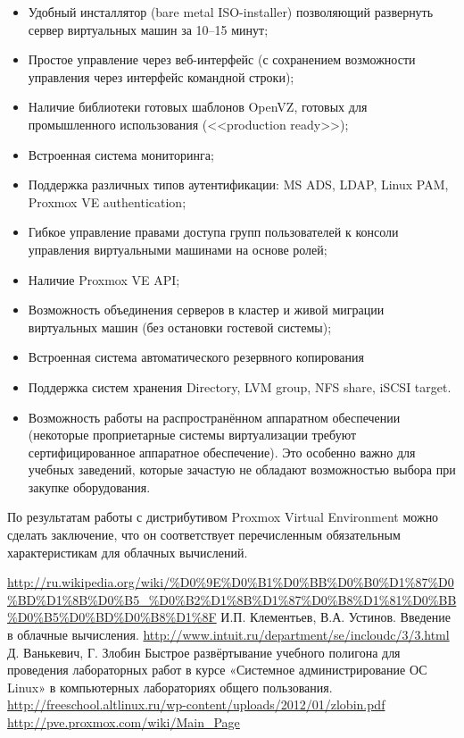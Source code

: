 \documentclass[10pt, a5paper]{article}
\begin{document}
\begin{itemize}
  \item Удобный инсталлятор (bare metal ISO-installer) позволяющий развернуть сервер виртуальных машин за 10--15 минут;
  \item Простое управление через веб-интерфейс (с сохранением возможности управления через интерфейс командной строки);
  \item Наличие библиотеки готовых шаблонов OpenVZ, готовых для промышленного использования (<<production ready>>);
  \item Встроенная система мониторинга;
  \item Поддержка различных типов аутентификации: MS ADS, LDAP, Linux PAM, Proxmox VE authentication;
  \item Гибкое управление правами доступа групп пользователей к консоли управления виртуальными машинами на основе ролей;
  \item Наличие Proxmox VE API;
  \item Возможность объединения серверов в кластер и живой миграции виртуальных машин (без остановки гостевой системы);
  \item Встроенная система автоматического резервного копирования
  \item Поддержка систем хранения Directory, LVM group, NFS share, iSCSI target.
  \item Возможность работы на распространённом аппаратном обеспечении (некоторые проприетарные системы виртуализации требуют сертифицированное аппаратное обеспечение). Это особенно \linebreak важно для учебных заведений, которые зачастую не обладают возможностью выбора при закупке оборудования.
\end{itemize}

По результатам работы с дистрибутивом  Proxmox Virtual \linebreak Environment можно сделать заключение, что он  соответствует перечисленным обязательным характеристикам для облачных вычислений.


\begin{thebibliography}{9}
 \url{http://ru.wikipedia.org/wiki/\%D0\%9E\%D0\%B1\%D0\%BB\%D0\%B0\%D1\%87\%D0\%BD\%D1\%8B\%D0\%B5_\%D0\%B2\%D1\%8B\%D1\%87\%D0\%B8\%D1\%81\%D0\%BB\%D0\%B5\%D0\%BD\%D0\%B8\%D1\%8F}
 И.П. Клементьев, В.А. Устинов. Введение в облачные вычисления. \url{http://www.intuit.ru/department/se/incloudc/3/3.html}
 Д. Ванькевич, Г. Злобин Быстрое развёртывание учебного полигона для проведения лабораторных работ в курсе «Системное администрирование ОС Linux» в компьютерных лабораториях общего пользования. \url{http://freeschool.altlinux.ru/wp-content/uploads/2012/01/zlobin.pdf}
 \url{http://pve.proxmox.com/wiki/Main\_Page}
\end{thebibliography}
\end{document}

